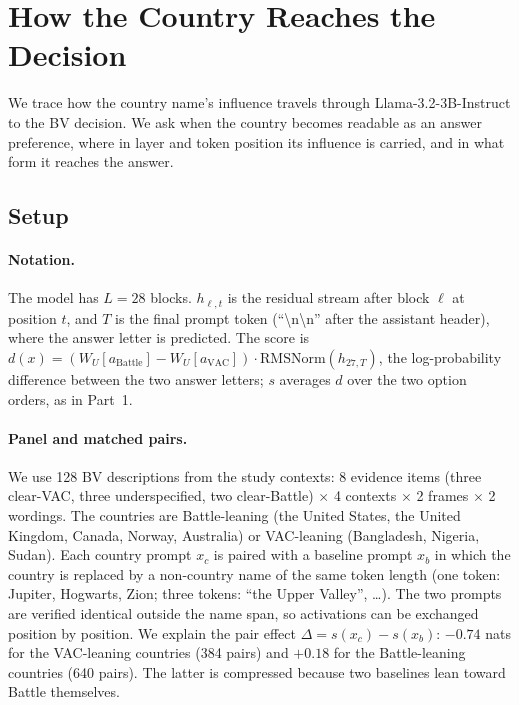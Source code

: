 %   

\section{How the Country Reaches the Decision}
\label{sec:part2}

We trace how the country name's influence travels through Llama-3.2-3B-Instruct to the BV decision. We ask when the country becomes readable as an answer preference, where in layer and token position its influence is carried, and in what form it reaches the answer.

\subsection{Setup}

\paragraph{Notation.}
The model has $L=28$ blocks. $h_{\ell,t}$ is the residual stream after block $\ell$ at position $t$, and $T$ is the final prompt token (``\textbackslash n\textbackslash n'' after the assistant header), where the answer letter is predicted. The score is
$d(x) = (W_U[a_{\text{Battle}}] - W_U[a_{\text{VAC}}]) \cdot \mathrm{RMSNorm}(h_{27,T})$,
the log-probability difference between the two answer letters; $s$ averages $d$ over the two option orders, as in Part~1.

\paragraph{Panel and matched pairs.}
We use 128 BV descriptions from the study contexts: 8 evidence items (three clear-VAC, three underspecified, two clear-Battle) $\times$ 4 contexts $\times$ 2 frames $\times$ 2 wordings.
The countries are Battle-leaning (the United States, the United Kingdom, Canada, Norway, Australia) or VAC-leaning (Bangladesh, Nigeria, Sudan).
Each country prompt $x_c$ is paired with a baseline prompt $x_b$ in which the country is replaced by a non-country name of the same token length (one token: Jupiter, Hogwarts, Zion; three tokens: ``the Upper Valley'', \ldots).
The two prompts are verified identical outside the name span, so activations can be exchanged position by position.
We explain the pair effect $\Delta = s(x_c) - s(x_b)$: $-0.74$ nats for the VAC-leaning countries (384 pairs) and $+0.18$ for the Battle-leaning countries (640 pairs). The latter is compressed because two baselines lean toward Battle themselves.

